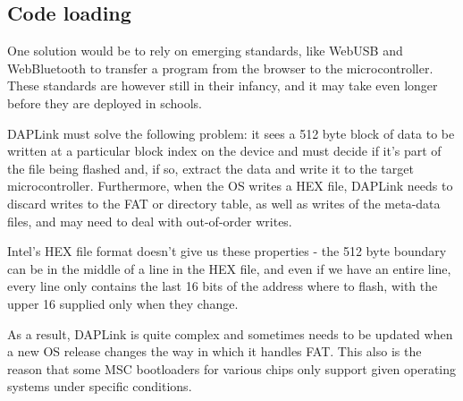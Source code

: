 

\subsection{Code loading}

One solution would be to rely on emerging standards, like WebUSB and WebBluetooth to transfer a program from the browser 
to the microcontroller. These standards are however still in their infancy, and it may take even longer before they are 
deployed in schools.

DAPLink must solve the following problem: it sees a 512 byte block of data to be written
at a particular block index on the device and must decide if it's part of the file being flashed and, if so, extract
the data and write it to the target microcontroller. Furthermore, when the OS writes a HEX file, DAPLink needs to discard
writes to the FAT or directory table, as well as writes of the meta-data files, and may need to deal with out-of-order writes.

Intel's HEX file format doesn't give us these properties 
- the 512 byte boundary can be in the middle of a line in the HEX file, 
and even if we have an entire line, every line only
contains the last 16 bits of the address where to flash, 
with the upper 16 supplied only when they change.

As a result, DAPLink is quite complex and sometimes needs to be updated when a new OS release changes the way
in which it handles FAT. 
This also is the reason that some MSC bootloaders for various chips only support given operating
systems under specific conditions.


